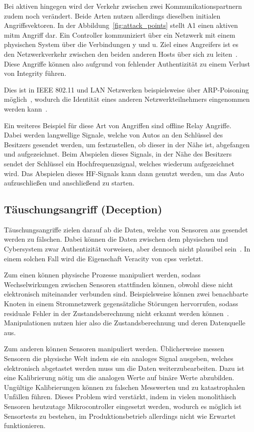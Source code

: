\documentclass[final,bibliography=totocnumbered]{include/sikseminar}
\newcommand{\cps}{\glspl{cps}\xspace}
\begin{document}
Bei aktiven hingegen wird der Verkehr zwischen zwei Kommunikationspartnern zudem noch verändert.
Beide Arten nutzen allerdings dieselben initialen Angriffsvektoren.
In der Abbildung~\ref{fig:attack_points} stellt A1 einen aktiven \gls{mitm} Angriff dar.
Ein Controller kommuniziert über ein Netzwerk mit einem physischen System über die Verbindungen y und u.
Ziel eines Angreifers ist es den Netzwerkverkehr zwischen den beiden anderen Hosts über sich zu leiten~\cite{WYX+10,FPA+18}.
Diese Angriffe können also aufgrund von fehlender Authentizität zu einem Verlust von Integrity führen.

Dies ist in IEEE 802.11 und LAN Netzwerken beispielsweise über ARP-Poisoning möglich~\cite{Francia2012}, wodurch die Identität eines anderen Netzwerkteilnehmers eingenommen werden kann~\cite{Ramachandran2005}.

Ein weiteres Beispiel für diese Art von Angriffen sind offline Relay Angriffe.
Dabei werden langwellige Signale, welche von Autos an den Schlüssel des Besitzers gesendet werden, um festzustellen, ob dieser in der Nähe ist, abgefangen und aufgezeichnet.
Beim Abspielen dieses Signals, in der Nähe des Besitzers sendet der Schlüssel ein Hochfrequenzsignal, welches wiederum aufgezeichnet wird.
Das Abspielen dieses HF-Signals kann dann genutzt werden, um das Auto aufzuschließen und anschließend zu starten.~\cite{HLL+17}

\subsection{Täuschungsangriff (Deception)}\label{subsec:tauschung} %
Täuschungsangriffe zielen darauf ab die Daten, welche von Sensoren aus gesendet werden zu fälschen.
Dabei können die Daten zwischen dem physischen und Cybersystem zwar Authentizität vorweisen, aber dennoch nicht plausibel sein~\cite{SFJ2017}.
In einem solchen Fall wird die Eigenschaft Veracity von \cps verletzt.

Zum einen können physische Prozesse manipuliert werden, sodass Wechselwirkungen zwischen Sensoren stattfinden können, obwohl diese nicht elektronisch miteinander verbunden sind.
Beispielsweise können zwei benachbarte Knoten in einem Stromnetzwerk gegensätzliche Störungen hervorrufen, sodass residuale Fehler in der Zustandsberechnung nicht erkannt werden können~\cite{Krotofil2015}.
Manipulationen nutzen hier also die Zustandsberechnung und deren Datenquelle aus.

Zum anderen können Sensoren manipuliert werden.
Üblicherweise messen Sensoren die physische Welt indem sie ein analoges Signal ausgeben, welches elektronisch abgetastet werden muss um die Daten weiterzubearbeiten.
Dazu ist eine Kalibrierung nötig um die analogen Werte auf binäre Werte abzubilden.
Ungültige Kalibrierungen können zu falschen Messwerten und zu katastrophalen Unfällen führen.
Dieses Problem wird verstärkt, indem in vielen monolithisch Sensoren heutzutage Mikrocontroller eingesetzt werden, wodurch es möglich ist Sensortests zu bestehen, im Produktionsbetrieb allerdings nicht wie Erwartet funktionieren.~\cite{Krotofil2015}
\end{document}

